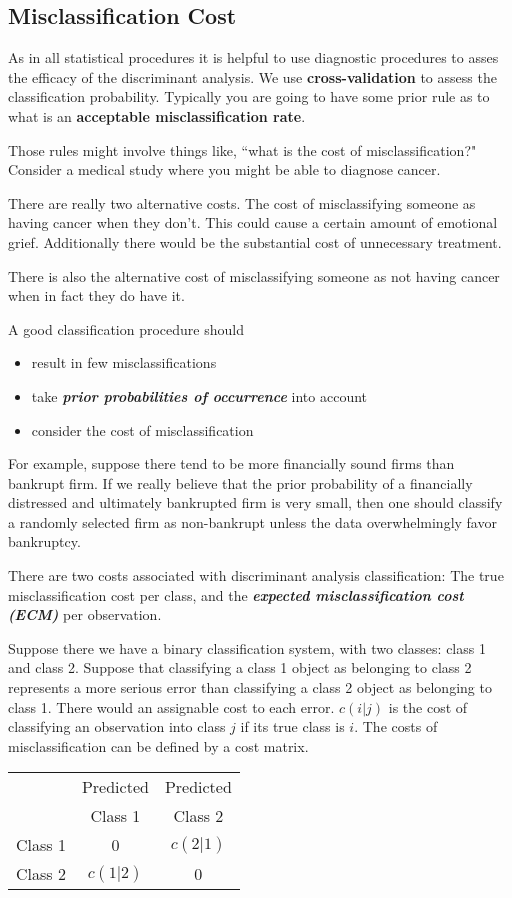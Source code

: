 \documentclass[a4paper,12pt]{article}
\begin{document}

\subsection{Misclassification Cost}

As in all statistical procedures it is helpful to use diagnostic procedures to asses the efficacy of the discriminant analysis. We use \textbf{cross-validation} to assess the classification probability.
Typically you are going to have some prior rule as to what is an \textbf{acceptable misclassification rate}.

Those rules might involve things like, ``what is the cost of misclassification?" Consider a medical study where you might be able to diagnose cancer.

There are really two alternative costs. The cost of misclassifying someone as having cancer when they don't.
This could cause a certain amount of emotional grief. Additionally there would be the substantial cost of unnecessary treatment.

There is also the alternative cost of misclassifying someone as not having cancer when in fact they do have it.

A good classification procedure should
\begin{itemize}
	\item result in few misclassifications
	\item take \textbf{\textit{prior probabilities of occurrence}} into account
	\item consider the cost of misclassification
\end{itemize}

For example, suppose there tend to be more financially sound firms than bankrupt
firm. If we really believe that the prior probability of a financially
distressed and ultimately bankrupted firm is very small, then one should
classify a randomly selected firm as non-bankrupt unless the data
overwhelmingly favor bankruptcy.



There are two costs associated with discriminant analysis classification: The true misclassification cost per class, and the \textbf{\textit{expected misclassification cost (ECM)}} per observation.

Suppose there we have a binary classification system, with two classes: class 1 and class 2.
Suppose that classifying a class 1 object as belonging to class 2 represents a more serious error than classifying a class 2 object as belonging to class 1. There would an assignable cost to each error.
$c(i|j)$ is the cost of classifying an observation into class $j$ if its true class is $i$.
The costs of misclassification can be defined by a cost matrix.

\begin{tabular}{|c|c|c|}
	\hline
	& Predicted & Predicted \\
	& Class 1 & Class 2 \\  \hline
	Class 1 & 0 & $c(2|1)$  \\
	Class 2 & $c(1|2)$ & 0 \\
	\hline
\end{tabular}

\end{document}
